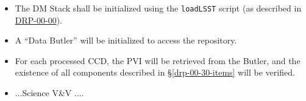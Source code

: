 \begin{itemize}

  \item{The DM Stack shall be initialized using the \texttt{loadLSST} script
  (as described in \hyperref[drp-00-00]{DRP-00-00}).}

  \item{A ``Data Butler'' will be initialized to access the repository.}

  \item{For each processed CCD, the PVI will be retrieved from the Butler, and
  the existence of all components described in \S\ref{drp-00-30-items} will be
  verified.}

  \item{...Science V\&V ....}

\end{itemize}
